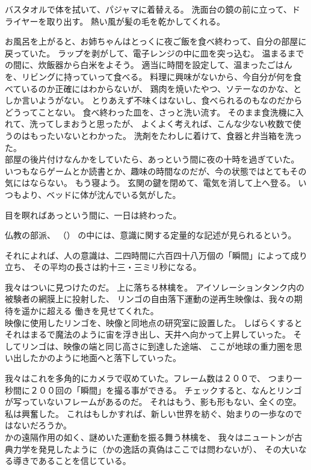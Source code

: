 \documentclass[../IHMain]{subfiles}
\begin{document}
バスタオルで体を拭いて、パジャマに着替える。
洗面台の鏡の前に立って、ドライヤーを取り出す。
熱い風が髪の毛を乾かしてくれる。

お風呂を上がると、お姉ちゃんはとっくに夜ご飯を食べ終わって、自分の部屋に戻っていた。
ラップを剥がして、電子レンジの中に皿を突っ込む。
温まるまでの間に、炊飯器から白米をよそう。
適当に時間を設定して、温まったごはんを、リビングに持っていって食べる。
料理に興味がないから、今自分が何を食べているのか正確にはわからないが、
鶏肉を焼いたやつ、ソテーなのかな、としか言いようがない。
とりあえず不味くはないし、食べられるのもなのだからどうってことない。
食べ終わった皿を、さっと洗い流す。
そのまま食洗機に入れて、洗ってしまおうと思ったが、
よくよく考えれば、こんな少ない枚数で使うのはもったいないとわかった。
洗剤をたわしに着けて、食器と弁当箱を洗った。\\

部屋の後片付けなんかをしていたら、あっという間に夜の十時を過ぎていた。
いつもならゲームとか読書とか、趣味の時間なのだが、今の状態ではとてもその気にはならない。
もう寝よう。
玄関の鍵を閉めて、電気を消して上へ登る。
いつもより、ベッドに体が沈んでいる気がした。

目を瞑ればあっという間に、一日は終わった。

\newpage
{\onecolumn
\markboth{}{}
\begin{center}
\end{center}

仏教の部派、
（）
の中には、意識に関する定量的な記述が見られるという。

それによれば、人の意識は、二四時間に六百四十八万個の「瞬間」によって成り立ち、
その平均の長さは約十三・三ミリ秒になる。
\begin{center}
\end{center}}

我々はついに見つけたのだ。
上に落ちる林檎を。
アイソレーションタンク内の被験者の網膜上に投射した、
リンゴの自由落下運動の逆再生映像は、我々の期待を遥かに超える
働きを見せてくれた。\\

映像に使用したリンゴを、映像と同地点の研究室に設置した。
しばらくするとそれはまるで魔法のように宙を浮き出し、天井へ向かって上昇していった。
そしてリンゴは、映像の端と同じ高さに到達した途端、
ここが地球の重力圏を思い出したかのように地面へと落下していった。

我々はこれを多角的にカメラで収めていた。フレーム数は２００で、
つまり一秒間に２００回の「瞬間」を撮る事ができる。
チェックすると、なんとリンゴが写っていないフレームがあるのだ。
それはもう、影も形もない、全くの空。
私は興奮した。
これはもしかすれば、新しい世界を紡ぐ、始まりの一歩なのではないだろうか。\\

かの遠隔作用の如く、謎めいた運動を振る舞う林檎を、
我々はニュートンが古典力学を発見したように（かの逸話の真偽はここでは問わないが）、
その大いなる導きであることを信じている。
\twocolumn
\end{document}
